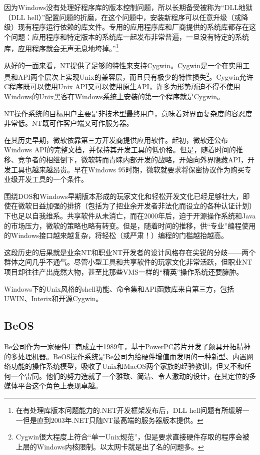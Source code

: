 \documentclass[12pt,oneside]{book}
\begin{document}
因为Windows没有处理好程序库的版本控制问题，所以长期备受被称为“DLL地狱（DLL hell）”配置问题的折磨，在这个问题中，安装新程序可以任意升级（或降级）现有程序运行依赖的库文件。专用的应用程序库和厂商提供的系统库都存在这个问题：应用程序和特定版本的系统库一起发布非常普遍，一旦没有特定的系统库，应用程序就会无声无息地垮掉。”\footnote{在有处理库版本问题能力的.NET开发框架发布后，DLL hell问题有所缓解一一但是直到2003年.NET只随NT最高端的服务器版本提供。}

从好的一面来看，NT提供了足够的特性来支持Cygwin。Cygwin是一个在实用工具和API两个层次上实现Unix的兼容层，而且只有极少的特性损失\footnote{Cygwin很大程度上符合“单一Unix规范”，但是要求直接硬件存取的程序会被上层的Windows内核限制。以太网卡就是出了名的问题多。}。Cygwin允许C程序既可以使用Unix API又可以使用原生API，许多为形势所迫不得不使用Windows的Unix黑客在Windows系统上安装的第一个程序就是Cygwin。

NT操作系统的目标用户主要是非技术型最终用户，意味着对界面复杂度的容忍度非常低。NT既可作客户端又可作服务器。

在其历史早期，微软依靠第三方开发商提供应用软件。起初，微软还公布Windows API的完整文档，并保持其开发工具的低价格。但是，随着时间的推移、竞争者的相继倒下，微软转而青睐内部开发的战略，开始向外界隐藏API，开发工具也越来越昂贵。早在Windows 95时期，微软就要求将保密协议作为购买专业级开发工具的一个条件。

围绕DOS和Windows早期版本形成的玩家文化和轻松开发文化已经足够壮大，即使在微软日益加强的排挤（包括为了把业余开发者非法化而设立的各种认证计划）下也足以自我维系。共享软件从未消亡，而在2000年后，迫于开源操作系统和Java的市场压力，微软的策略也略有转变。但是，随着时间的推移，供“专业”编程使用的Windows接口越来越复杂，将轻松（或严肃！）编程的门槛越抬越高。

这段历史的后果就是业余NT和职业NT开发者的设计风格存在尖锐的分歧——两个群体之间几乎不通气。尽管小型工具和共享软件的玩家文化非常活跃，但职业NT项目却往往产出庞然大物，甚至比那些VMS一样的“精英”操作系统还要臃肿。

Windows下的Unix风格的shell功能、命令集和API函数库来自第三方，包括UWIN、Interix和开源Cygwin。
 
\subsection{BeOS}
Be公司作为一家硬件厂商成立于1989年，基于PowerPC芯片开发了颇具开拓精神的多处理机器。BeOS操作系统是Be公司为给硬件增值而发明的一种新型、内置网络功能的操作系统模型，吸收了Unix和MacOS两个家族的经验教训，但又不和任何一个雷同。他们的努力造就了一个雅致、简洁、令人激动的设计，在其定位的多媒体平台这个角色上表现卓越。
\end{document}
